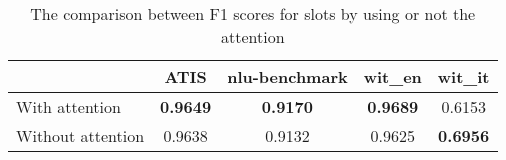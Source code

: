 
\begin{table}
  \begin{tabularx}{\textwidth}{Lcccc}
    \toprule
    & \textbf{ATIS} & \textbf{nlu-benchmark} & \textbf{wit\_en} & \textbf{wit\_it} \\
    \midrule
    With attention & \textbf{0.9649} & \textbf{0.9170} & \textbf{0.9689} & 0.6153 \\
    Without attention & 0.9638 & 0.9132 & 0.9625 & \textbf{0.6956} \\
    \bottomrule
  \end{tabularx}
  \caption{The comparison between F1 scores for slots by using or not the attention}\label{tab:attentionVsNot}
\end{table}
